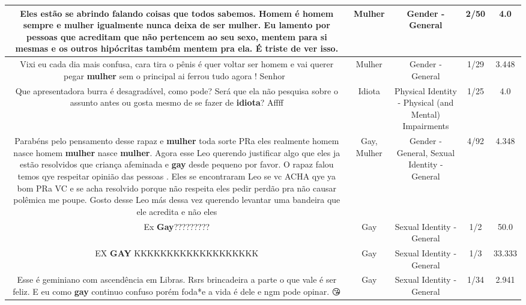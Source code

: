 \documentclass[11pt]{article}
\newlength\mylength
\begin{document}
\begin{center}
\begin{longtable}{|C{.65\mylength}|C{.30\mylength}|C{.12\mylength}|C{.12\mylength}|C{.12\mylength}|}
  \small Eles estão se abrindo falando coisas que todos sabemos. Homem é homem sempre e \textbf{mulher} igualmente nunca deixa de ser \textbf{mulher}. Eu lamento por pessoas que acreditam que não pertencem ao seu sexo, mentem para si mesmas e os outros hipócritas também mentem pra ela. É triste de ver isso.\normalsize   & Mulher & Gender - General & 2/50 & 4.0 \\  \hline
  \small Vixi eu cada dia mais confusa, cara tira o pênis é quer voltar ser homem e vai querer pegar \textbf{mulher} sem o principal ai ferrou tudo agora ! Senhor🤦‍♀️\normalsize   & Mulher & Gender - General & 1/29 & 3.448 \\  \hline
  \small Que apresentadora burra é desagradável, como pode? Será que ela não pesquisa sobre o assunto antes ou gosta mesmo de se fazer de \textbf{idiota}? Affff\normalsize   & Idiota & Physical Identity - Physical (and Mental) Impairments & 1/25 & 4.0 \\  \hline
  \small Parabéns pelo pensamento desse rapaz e \textbf{mulher}  toda sorte PRa eles realmente homem nasce homem \textbf{mulher} nasce \textbf{mulher}. Agora esse Leo querendo justificar algo que eles ja estão resolvidos que criança afeminada e \textbf{gay} desde pequeno por favor. O rapaz falou temos qye respeitar opinião das pessoas . Eles se encontraram Leo se vc ACHA qye ya bom PRa VC e se acha resolvido porque não respeita eles pedir perdão pra não causar polêmica me poupe. Gosto desse Leo más dessa vez querendo levantar uma bandeira que ele acredita e não eles\normalsize   & Gay, Mulher & Gender - General, Sexual Identity - General & 4/92 & 4.348 \\  \hline
  \small Ex \textbf{Gay}?????????\normalsize   & Gay & Sexual Identity - General & 1/2 & 50.0 \\  \hline
  \small EX \textbf{GAY} KKKKKKKKKKKKKKKKKKK\normalsize   & Gay & Sexual Identity - General & 1/3 & 33.333 \\  \hline
  \small Esse é geminiano com ascendência em Libras. Rsrs brincadeira a parte o que vale é ser feliz. E eu como \textbf{gay} continuo confuso porém foda*e a vida é dele e ngm pode opinar. 😘\normalsize   & Gay & Sexual Identity - General & 1/34 & 2.941 \\  \hline

\end{longtable}
\end{center}
\end{document}
